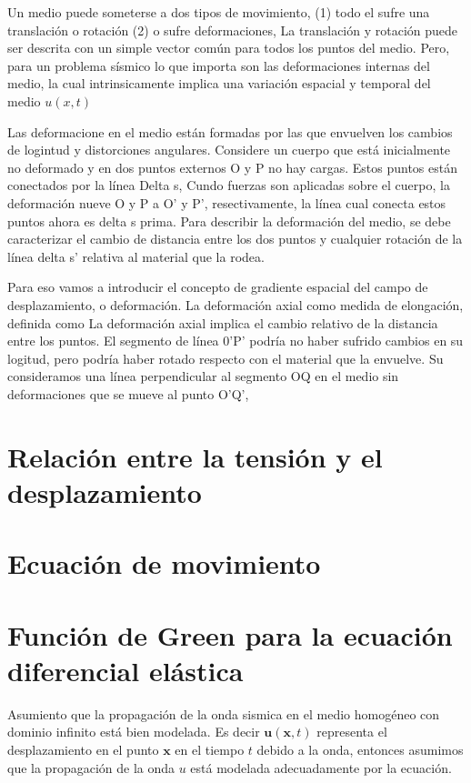 Un medio puede someterse a  dos tipos de movimiento, (1) todo el sufre una
translación o rotación (2) o sufre deformaciones, La translación y rotación
puede ser descrita con un simple vector común para todos los puntos del medio.
Pero, para un problema sísmico lo que importa son las deformaciones internas del
medio, la cual intrinsicamente implica una variación espacial y temporal del
medio $u(x,t)$

Las deformacione en el medio están formadas por las que envuelven los cambios de
logintud y distorciones angulares. Considere un cuerpo que está inicialmente no
deformado y en dos puntos externos O y P no hay cargas. Estos puntos están
conectados por la línea Delta s, Cundo fuerzas son aplicadas sobre el cuerpo, la
deformación nueve O y P  a O’ y P’, resectivamente, la línea cual conecta estos
puntos ahora es delta s prima. Para describir la deformación del medio, se debe
caracterizar el cambio de distancia entre los dos puntos y cualquier rotación de
la línea delta s’ relativa al material que la rodea.

Para eso vamos a introducir el concepto de gradiente espacial del campo de
desplazamiento, o deformación. La deformación axial como medida de elongación,
definida como
La deformación axial implica el cambio relativo de la distancia entre los
puntos. El segmento de línea 0’P’ podría no haber sufrido cambios en su logitud,
pero podría haber rotado respecto con el material que la envuelve. Su
consideramos una línea perpendicular al segmento OQ en el medio sin
deformaciones que se mueve al punto O’Q’,


\section{Relación entre la tensión y el desplazamiento}

\section{Ecuación de movimiento}

\section{Función de Green para la ecuación diferencial elástica}

Asumiento que la propagación de la onda sismica en el medio homogéneo con
dominio infinito está bien modelada. Es decir
$\mathbf{u}\left(\mathbf{x},t\right)$ representa el desplazamiento en el punto
$\mathbf{x}$ en el tiempo $t$ debido a la onda, entonces asumimos que la
propagación de la onda $u$ está modelada adecuadamente por la ecuación.

